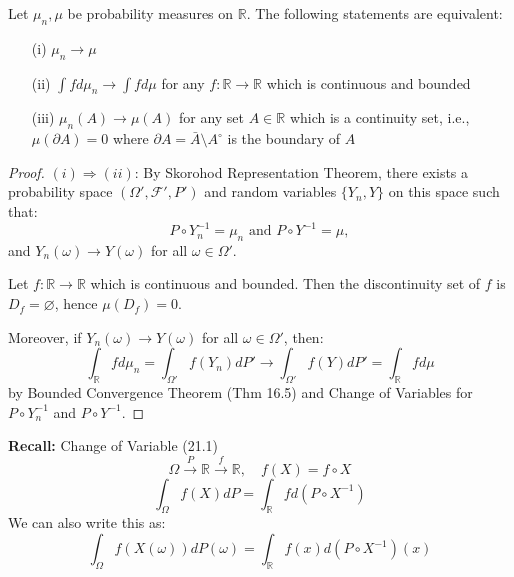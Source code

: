 \begin{theorem}
Let \( \mu_n, \mu \) be probability measures on \( \mathbb{R} \). The following statements are equivalent:
\begin{enumerate}
    \item[(i)] \( \mu_n \rightarrow \mu \)
    \item[(ii)] \( \int f d\mu_n \rightarrow \int f d\mu \) for any \( f: \mathbb{R} \rightarrow \mathbb{R} \) which is continuous and bounded
    \item[(iii)] \( \mu_n(A) \rightarrow \mu(A) \) for any set \( A \in \mathbb{R} \) which is a continuity set, i.e., \( \mu(\partial A) = 0 \) where \( \partial A = \bar{A} \setminus A^{\circ} \) is the boundary of \( A \)
\end{enumerate}
\end{theorem}
\begin{proof}
\( (i) \Rightarrow (ii) \): By Skorohod Representation Theorem, there exists a probability space \( (\Omega', \mathcal{F}', P') \) and random variables \( \{Y_n, Y\} \) on this space such that:
\[ P \circ Y_n^{-1} = \mu_n \text{ and } P \circ Y^{-1} = \mu, \]
and \( Y_n(\omega) \rightarrow Y(\omega) \) for all \( \omega \in \Omega' \).

Let \( f: \mathbb{R} \rightarrow \mathbb{R} \) which is continuous and bounded. Then the discontinuity set of \( f \) is \( D_f = \varnothing \), hence \( \mu(D_f) = 0 \).

Moreover, if \( Y_n(\omega) \rightarrow Y(\omega) \) for all \( \omega \in \Omega' \), then:
\[ \int_{\mathbb{R}} f d\mu_n = \int_{\Omega'} f(Y_n) dP' \rightarrow \int_{\Omega'} f(Y) dP' = \int_{\mathbb{R}} f d\mu \]
by Bounded Convergence Theorem (Thm 16.5) and Change of Variables for \( P \circ Y_n^{-1} \) and \( P \circ Y^{-1} \).
\end{proof}
\textbf{Recall:} Change of Variable (21.1)
\[
\Omega \xrightarrow{P} \mathbb{R} \xrightarrow{f} \mathbb{R}, \quad f(X) = f \circ X
\]
\[
\int_{\Omega} f(X) dP = \int_{\mathbb{R}} f d(P \circ X^{-1})
\]
We can also write this as:
\[
\int_{\Omega} f(X(\omega)) dP(\omega) = \int_{\mathbb{R}} f(x) d(P \circ X^{-1})(x)
\]